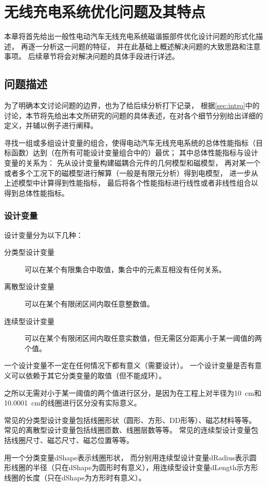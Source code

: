 \documentclass[index]{subfiles}
\begin{document}
\chapter{无线充电系统优化问题及其特点}\label{sec:fea}
本章将首先给出一般性电动汽车无线充电系统磁谐振部件优化设计问题的形式化描述，
再逐一分析这一问题的特征，
并在此基础上概述解决问题的大致思路和注意事项。
后续章节将会对解决问题的具体手段进行详述。

\section{问题描述}
为了明确本文讨论问题的边界，也为了给后续分析打下记录，
根据\cref{sec:intro}中的讨论，本节将先给出本文所研究的问题的具体表述，在对各个细节分别给出详细的定义，并辅以例子进行阐释。

\begin{definition}[一般性电动汽车无线充电系统磁谐振部件单目标优化设计问题]\label{def:problem}
  寻找一组或多组设计变量的组合，使得电动汽车无线充电系统的总体性能指标（目标函数）达到（在所有可能设计变量组合中的）最优；
  其中总体性能指标与设计变量的关系为：
  先从设计变量构建磁耦合元件的几何模型和磁模型，
  再对某一个或者多个工况下的磁模型进行解算（一般是有限元分析）得到电模型，
  进一步从上述模型中计算得到性能指标，
  最后将各个性能指标进行线性或者非线性组合以得到总体性能指标。
\end{definition}

\subsection{设计变量}
\begin{definition}[设计变量]\label{def:dvars}
  设计变量分为以下几种：
  \begin{description}
    \item[分类型设计变量] 可以在某个有限集合中取值，集合中的元素互相没有任何关系。
    \item[离散型设计变量] 可以在某个有限闭区间内取任意整数值。
    \item[连续型设计变量] 可以在某个有限闭区间内取任意实数值，但无需区分距离小于某一阈值的两个值。
  \end{description}
  一个设计变量不一定在任何情况下都有意义（需要设计）。
  一个设计变量是否有意义可以依赖于其它分类变量的取值（但不能成环）。
\end{definition}
\begin{remark}[连续型设计变量的阈值]
  之所以无需对小于某一阈值的两个值进行区分，是因为在工程上对半径为\SI{10}{\centi\meter}和\SI{10.0001}{\centi\meter}的线圈进行区分没有实际意义。
\end{remark}
\begin{example}[设计变量的分类]
  常见的分类型设计变量包括线圈形状（圆形、方形、DD形等）、磁芯材料等等。
  常见的离散型设计变量包括线圈匝数、线圈层数等等。
  常见的连续型设计变量包括线圈尺寸、磁芯尺寸、磁芯位置等等。
\end{example}
\begin{example}[设计变量的依赖关系]
  用一个分类变量dShape表示线圈形状，
  而分别用连续型设计变量dRadius表示圆形线圈的半径（只在dShape为圆形时有意义），用连续型设计变量dLength示方形线圈的长度（只在dShape为方形时有意义）。
\end{example}
\end{document}
